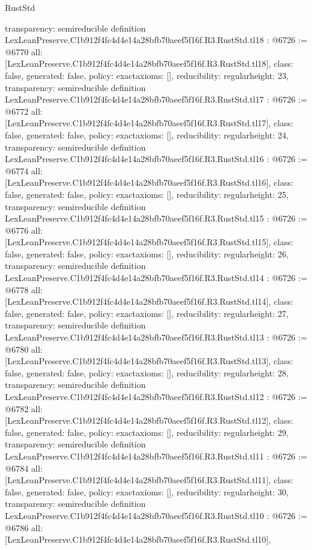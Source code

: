 \begin{lexlean}{RustStd}
\begin{coremodule}
{  transparency: semireducible
}
definition LexLeanPreserve.C1b912f4fc4d4e14a28bfb70aeef5f16f.R3.RustStd.tl18 : @6726 := @6770 {
  all: [LexLeanPreserve.C1b912f4fc4d4e14a28bfb70aeef5f16f.R3.RustStd.tl18],
  class: false,
  generated: false,
  policy: exact{axioms: []},
  reducibility: regular{height: 23},
  transparency: semireducible
}
definition LexLeanPreserve.C1b912f4fc4d4e14a28bfb70aeef5f16f.R3.RustStd.tl17 : @6726 := @6772 {
  all: [LexLeanPreserve.C1b912f4fc4d4e14a28bfb70aeef5f16f.R3.RustStd.tl17],
  class: false,
  generated: false,
  policy: exact{axioms: []},
  reducibility: regular{height: 24},
  transparency: semireducible
}
definition LexLeanPreserve.C1b912f4fc4d4e14a28bfb70aeef5f16f.R3.RustStd.tl16 : @6726 := @6774 {
  all: [LexLeanPreserve.C1b912f4fc4d4e14a28bfb70aeef5f16f.R3.RustStd.tl16],
  class: false,
  generated: false,
  policy: exact{axioms: []},
  reducibility: regular{height: 25},
  transparency: semireducible
}
definition LexLeanPreserve.C1b912f4fc4d4e14a28bfb70aeef5f16f.R3.RustStd.tl15 : @6726 := @6776 {
  all: [LexLeanPreserve.C1b912f4fc4d4e14a28bfb70aeef5f16f.R3.RustStd.tl15],
  class: false,
  generated: false,
  policy: exact{axioms: []},
  reducibility: regular{height: 26},
  transparency: semireducible
}
definition LexLeanPreserve.C1b912f4fc4d4e14a28bfb70aeef5f16f.R3.RustStd.tl14 : @6726 := @6778 {
  all: [LexLeanPreserve.C1b912f4fc4d4e14a28bfb70aeef5f16f.R3.RustStd.tl14],
  class: false,
  generated: false,
  policy: exact{axioms: []},
  reducibility: regular{height: 27},
  transparency: semireducible
}
definition LexLeanPreserve.C1b912f4fc4d4e14a28bfb70aeef5f16f.R3.RustStd.tl13 : @6726 := @6780 {
  all: [LexLeanPreserve.C1b912f4fc4d4e14a28bfb70aeef5f16f.R3.RustStd.tl13],
  class: false,
  generated: false,
  policy: exact{axioms: []},
  reducibility: regular{height: 28},
  transparency: semireducible
}
definition LexLeanPreserve.C1b912f4fc4d4e14a28bfb70aeef5f16f.R3.RustStd.tl12 : @6726 := @6782 {
  all: [LexLeanPreserve.C1b912f4fc4d4e14a28bfb70aeef5f16f.R3.RustStd.tl12],
  class: false,
  generated: false,
  policy: exact{axioms: []},
  reducibility: regular{height: 29},
  transparency: semireducible
}
definition LexLeanPreserve.C1b912f4fc4d4e14a28bfb70aeef5f16f.R3.RustStd.tl11 : @6726 := @6784 {
  all: [LexLeanPreserve.C1b912f4fc4d4e14a28bfb70aeef5f16f.R3.RustStd.tl11],
  class: false,
  generated: false,
  policy: exact{axioms: []},
  reducibility: regular{height: 30},
  transparency: semireducible
}
definition LexLeanPreserve.C1b912f4fc4d4e14a28bfb70aeef5f16f.R3.RustStd.tl10 : @6726 := @6786 {
  all: [LexLeanPreserve.C1b912f4fc4d4e14a28bfb70aeef5f16f.R3.RustStd.tl10],
}
\end{coremodule}
\end{lexlean}
